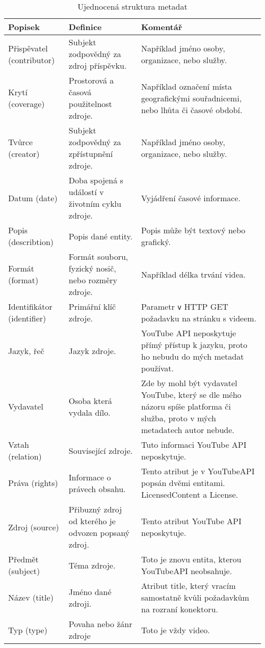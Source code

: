 \begin{table}[h!]
\begin{tabular}{|p{} | p{} | p{}|}
\hline
Popisek & Definice & Komentář\\
\hline
Přispěvatel (contributor) & Subjekt zodpovědný za zdroj příspěvku. & Například jméno osoby, organizace, nebo služby.\\
\hline
Krytí (coverage) & Prostorová a časová použitelnost zdroje. & Například označení místa geografickými souřadnicemi, nebo lhůta či časové období.\\
\hline
Tvůrce (creator) & Subjekt zodpovědný za zpřístupnění zdroje. & Například jméno osoby, organizace, nebo služby.\\
\hline
Datum (date) & Doba spojená s událostí v životním cyklu zdroje. & Vyjádření časové informace. \\
\hline
Popis (describtion) & Popis dané entity. & Popis může být textový nebo grafický. \\
\hline
Formát (format) & Formát souboru, fyzický nosič, nebo rozměry zdroje. & Například délka trvání videa. \\
\hline
Identifikátor (identifier) & Primářní klíč zdroje. & Parametr \texttt{v} HTTP GET požadavku na stránku s videem.\\
\hline
Jazyk, řeč & Jazyk zdroje. & YouTube API neposkytuje přímý přístup k jazyku, proto ho nebudu do mých metadat používat.\\
\hline
Vydavatel & Osoba která vydala dílo. & Zde by mohl být vydavatel YouTube, který se dle mého názoru spíše platforma či služba, proto v mých metadatech autor nebude.\\
\hline
Vztah (relation) & Související zdroje. & Tuto informaci YouTube API neposkytuje.\\
\hline
Práva (rights) & Informace o právech obsahu. & Tento atribut je v YouTubeAPI popsán dvěmi entitami. LicensedContent a License.\\
\hline
Zdroj (source) & Přibuzný zdroj od kterého je odvozen popsaný zdroj. & Tento atribut YouTube API neposkytuje.\\
\hline
Předmět (subject) & Téma zdroje. & Toto je znovu entita, kterou YouTubeAPI neobsahuje.\\
\hline
Název (title) & Jméno dané zdroji. & Atribut title, který vracím samostatně kvůli požadavkům na rozraní konektoru.\\
\hline
Typ (type) & Povaha nebo žánr zdroje & Toto je vždy video.\\
\hline
\end{tabular}
\caption[DublinCore metadata]{Ujednocená struktura metadat}\label{tab:dublincore1}
\end{table}
\hfill